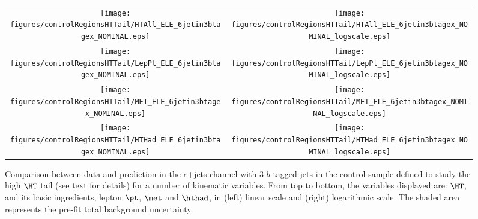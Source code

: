 \begin{figure}[htbp]
\begin{center}
\begin{tabular}{cc}
%
\texttt{[image: figures/controlRegionsHTTail/HTAll\_ELE\_6jetin3btagex\_NOMINAL.eps]} &
\texttt{[image: figures/controlRegionsHTTail/HTAll\_ELE\_6jetin3btagex\_NOMINAL\_logscale.eps]} \\
\texttt{[image: figures/controlRegionsHTTail/LepPt\_ELE\_6jetin3btagex\_NOMINAL.eps]} &
\texttt{[image: figures/controlRegionsHTTail/LepPt\_ELE\_6jetin3btagex\_NOMINAL\_logscale.eps]} \\
\texttt{[image: figures/controlRegionsHTTail/MET\_ELE\_6jetin3btagex\_NOMINAL.eps]} &
\texttt{[image: figures/controlRegionsHTTail/MET\_ELE\_6jetin3btagex\_NOMINAL\_logscale.eps]} \\
\texttt{[image: figures/controlRegionsHTTail/HTHad\_ELE\_6jetin3btagex\_NOMINAL.eps]} &
\texttt{[image: figures/controlRegionsHTTail/HTHad\_ELE\_6jetin3btagex\_NOMINAL\_logscale.eps]} \\

\end{tabular}\caption{\small {Comparison between data and prediction in the $e$+jets channel with 3 $b$-tagged jets in the control sample
defined to study the high $\HT$ tail (see text for details)  for a number of kinematic
variables. From top to bottom, the variables displayed are: $\HT$, and its basic ingredients, lepton $\pt$, $\met$ and $\hthad$,
in (left) linear scale and (right) logarithmic scale.
The shaded area represents the pre-fit total background uncertainty.}}
\label{fig:ELE_controlHTTail_3btagex_1}
\end{center}
\end{figure}
